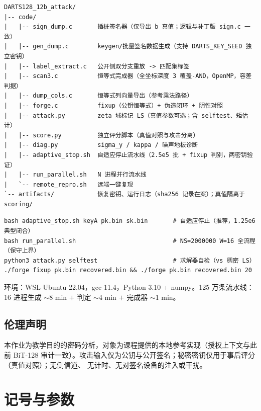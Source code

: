 \documentclass[UTF8,11pt,a4paper]{ctexart}
\begin{document}
\begin{verbatim}
DARTS128_12b_attack/
|-- code/
|   |-- sign_dump.c       插桩签名器（仅导出 b 真值；逻辑与补丁版 sign.c 一致）
|   |-- gen_dump.c        keygen/批量签名数据生成（支持 DARTS_KEY_SEED 独立密钥）
|   |-- label_extract.c   公开侧双分支重放 -> 匹配集标签
|   |-- scan3.c           恒等式完成器（全坐标深度 3 覆盖-AND，OpenMP，容差判据）
|   |-- dump_cols.c       恒等式列向量导出（参考乘法路径）
|   |-- forge.c           fixup（公钥恒等式）+ 伪造闭环 + 阴性对照
|   |-- attack.py         zeta 域标记 LS（真值参数可选；含 selftest、矩估计）
|   |-- score.py          独立评分脚本（真值对照与攻击分离）
|   |-- diag.py           sigma_y / kappa / 噪声地板诊断
|   |-- adaptive_stop.sh  自适应停止流水线（2.5e5 批 + fixup 判别，两密钥验证）
|   |-- run_parallel.sh   N 进程并行流水线
|   `-- remote_repro.sh   远端一键复现
`-- artifacts/            恢复密钥、运行日志（sha256 记录在案）；真值隔离于 scoring/
\end{verbatim}

\begin{verbatim}
bash adaptive_stop.sh keyA pk.bin sk.bin       # 自适应停止（推荐，1.25e6 典型闭合）
bash run_parallel.sh                           # NS=2000000 W=16 全流程（保守上界）
python3 attack.py selftest                     # 求解器自检（vs 稠密 LS）
./forge fixup pk.bin recovered.bin && ./forge pk.bin recovered.bin 20
\end{verbatim}

环境：WSL Ubuntu-22.04，gcc 11.4，Python 3.10 + numpy。125 万条流水线：
16 进程生成 $\sim$8 min $+$ 判定 $\sim$4 min $+$ 完成器 $\sim$1 min。

\subsection{伦理声明}

本作业为教学目的的密码分析，对象为课程提供的本地参考实现（授权上下文与此前 BiT-128
审计一致）。攻击输入仅为公钥与公开签名；秘密密钥仅用于事后评分（真值对照）；无侧信道、
无计时、无对签名设备的注入或干扰。

\appendix

\section{记号与参数}
\end{document}
